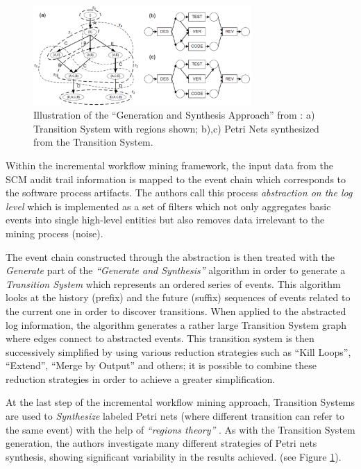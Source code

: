 \documentclass{sig-alternate}
\begin{document}
\begin{figure}[tbp]
   \centering
   \includegraphics[height=38mm]{petri.eps}
   \caption{Illustration of the ``Generation and Synthesis Approach'' from \cite{citeulike:5043673}: a) Transition System with regions shown; b),c) Petri Nets synthesized from the Transition System.}
   \label{fig:petri}
\end{figure}

Within the incremental workflow mining framework, the input data from the SCM audit trail information is mapped to the event chain which corresponds to the software process artifacts. The authors call this process \textit{abstraction on the log level} which is implemented as a set of filters which not only aggregates basic events into single high-level entities but also removes data irrelevant to the mining process (noise). 

The event chain constructed through the abstraction is then treated with the \textit{Generate} part of the \textit{``Generate and Synthesis''} \cite{citeulike:3718014} algorithm in order to generate a \textit{Transition System} which represents an ordered series of events. This algorithm looks at the history (prefix) and the future (suffix) sequences of events related to the current one in order to discover transitions.  When applied to the abstracted log information, the algorithm generates a rather large Transition System graph where edges connect to abstracted events. This transition system is then successively simplified by using various reduction strategies such as ``Kill Loops'', ``Extend'', ``Merge by Output'' and others; it is possible to combine these reduction strategies in order to achieve a greater simplification.

At the last step of the incremental workflow mining approach, Transition Systems are used to \textit{Synthesize} labeled Petri nets (where different transition can refer to the same event) with the help of \textit{``regions theory''} \cite{citeulike:5128170}. As with the Transition System generation, the authors investigate many different strategies of Petri nets synthesis, showing significant variability in the results achieved. (see Figure \ref{fig:petri}).
\end{document}
